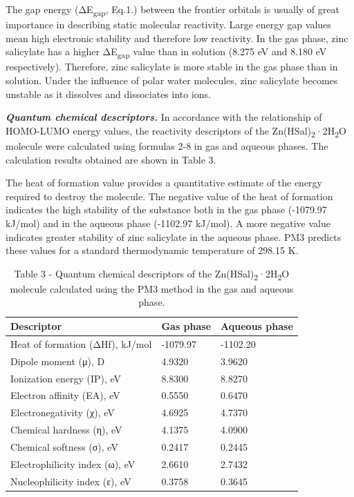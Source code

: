 \begin{multicols}{2}
The gap energy (ΔE\textsubscript{gap}, Eq.1.) between the frontier
orbitals is usually of great importance in describing static molecular
reactivity. Large energy gap values \hspace{0pt}\hspace{0pt}mean high
electronic stability and therefore low reactivity. In the gas phase,
zinc salicylate has a higher ΔE\textsubscript{gap} value than in
solution (8.275 eV and 8.180 eV respectively). Therefore, zinc
salicylate is more stable in the gas phase than in solution. Under the
influence of polar water molecules, zinc salicylate becomes unstable as
it dissolves and dissociates into ions.

{\bfseries \emph{Quantum chemical descriptors.}} In accordance with the
relationship of HOMO-LUMO energy values, the reactivity descriptors of
the Zn(HSal)\textsubscript{2}·2H\textsubscript{2}O molecule were
calculated using formulas 2-8 in gas and aqueous phases. The calculation
results obtained are shown in Table 3.

The heat of formation value provides a quantitative estimate of the
energy required to destroy the molecule. The negative value of the heat
of formation indicates the high stability of the substance both in the
gas phase (-1079.97 kJ/mol) and in the aqueous phase (-1102.97 kJ/mol).
A more negative value indicates greater stability of zinc salicylate in
the aqueous phase. PM3 predicts these values for a standard
thermodynamic temperature of 298.15 K.
\end{multicols}

\begin{table}[H]
\caption*{Table 3 - Quantum chemical descriptors of the Zn(HSal)\textsubscript{2}·2H\textsubscript{2}O molecule calculated using the PM3 method in the gas and aqueous phase.}
\centering
\begin{tabular}{|l|l|l|}
\hline
Descriptor & Gas phase & Aqueous phase \\ \hline
Heat of formation (ΔHf), kJ/mol & -1079.97 & -1102.20 \\ \hline
Dipole moment (μ), D & 4.9320 & 3.9620 \\ \hline
Ionization energy (IP), eV & 8.8300 & 8.8270 \\ \hline
Electron affinity (EA), eV & 0.5550 & 0.6470 \\ \hline
Electronegativity (χ), eV & 4.6925 & 4.7370 \\ \hline
Chemical hardness (η), eV & 4.1375 & 4.0900 \\ \hline
Chemical softness (σ), eV & 0.2417 & 0.2445 \\ \hline
Electrophilicity index (ω), eV & 2.6610 & 2.7432 \\ \hline
Nucleophilicity index (ε), eV & 0.3758 & 0.3645 \\ \hline
\end{tabular}
\end{table}

